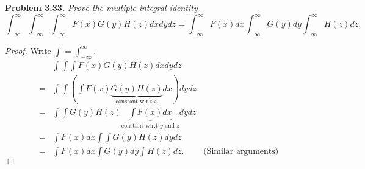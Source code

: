 \documentclass{article}
\begin{document}



\textbf{Problem 3.33.}
\emph{Prove the multiple-integral identity
\[
  \int_{-\infty}^{\infty}\int_{-\infty}^{\infty}\int_{-\infty}^{\infty}
    F(x)G(y)H(z)dx dy dz
  = \int_{-\infty}^{\infty} F(x) dx
    \int_{-\infty}^{\infty} G(y) dy
    \int_{-\infty}^{\infty} H(z) dz.
\]}

\emph{Proof.}
Write $\int = \int_{-\infty}^{\infty}$.
\begin{align*}
  &\int\int\int
    F(x)G(y)H(z)dx dy dz \\
  =&
  \int\int \left( \int F(x)\underbrace{G(y)H(z)}_{\text{constant w.r.t $x$}}dx \right) dy dz \\
  =&
  \int\int G(y)H(z) \underbrace{\int F(x)dx}_{\text{constant w.r.t $y$ and $z$}} dy dz \\
  =&
  \int F(x)dx \int\int G(y)H(z) dy dz \\
  =& \int F(x) dx\int G(y) dy\int H(z) dz.
    &\text{(Similar arguments)}
\end{align*}
$\Box$ \\\\



\end{document}
